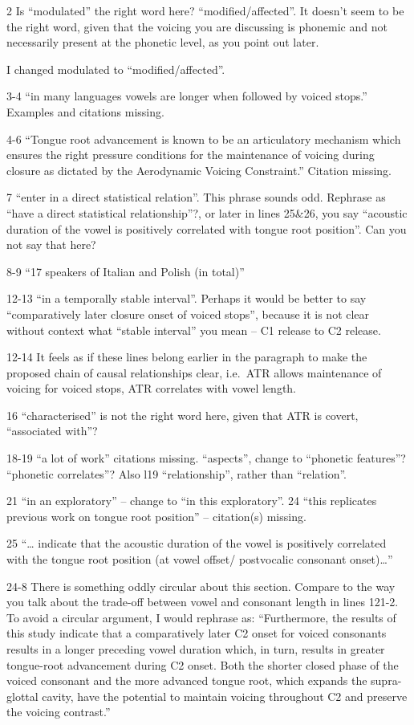 \documentclass[]{article}
\begin{document}
2 Is ``modulated'' the right word here? ``modified/affected''. It
doesn't seem to be the right word, given that the voicing you are
discussing is phonemic and not necessarily present at the phonetic
level, as you point out later.

\color{plum}

I changed modulated to ``modified/affected''. \color{black}

3-4 ``in many languages vowels are longer when followed by voiced
stops.'' Examples and citations missing.

4-6 ``Tongue root advancement is known to be an articulatory mechanism
which ensures the right pressure conditions for the maintenance of
voicing during closure as dictated by the Aerodynamic Voicing
Constraint.'' Citation missing.

7 ``enter in a direct statistical relation''. This phrase sounds odd.
Rephrase as ``have a direct statistical relationship''?, or later in
lines 25\&26, you say ``acoustic duration of the vowel is positively
correlated with tongue root position''. Can you not say that here?

8-9 ``17 speakers of Italian and Polish (in total)''

12-13 ``in a temporally stable interval''. Perhaps it would be better to
say ``comparatively later closure onset of voiced stops'', because it is
not clear without context what ``stable interval'' you mean -- C1
release to C2 release.

12-14 It feels as if these lines belong earlier in the paragraph to make
the proposed chain of causal relationships clear, i.e.~ATR allows
maintenance of voicing for voiced stops, ATR correlates with vowel
length.

16 ``characterised'' is not the right word here, given that ATR is
covert, ``associated with''?

18-19 ``a lot of work'' citations missing. ``aspects'', change to
``phonetic features''? ``phonetic correlates''? Also l19
``relationship'', rather than ``relation''.

21 ``in an exploratory'' -- change to ``in this exploratory''. 24 ``this
replicates previous work on tongue root position'' -- citation(s)
missing.

25 ``\ldots{} indicate that the acoustic duration of the vowel is
positively correlated with the tongue root position (at vowel offset/
postvocalic consonant onset)\ldots{}''

24-8 There is something oddly circular about this section. Compare to
the way you talk about the trade-off between vowel and consonant length
in lines 121-2. To avoid a circular argument, I would rephrase as:
``Furthermore, the results of this study indicate that a comparatively
later C2 onset for voiced consonants results in a longer preceding vowel
duration which, in turn, results in greater tongue-root advancement
during C2 onset. Both the shorter closed phase of the voiced consonant
and the more advanced tongue root, which expands the supra-glottal
cavity, have the potential to maintain voicing throughout C2 and
preserve the voicing contrast.''
\end{document}
